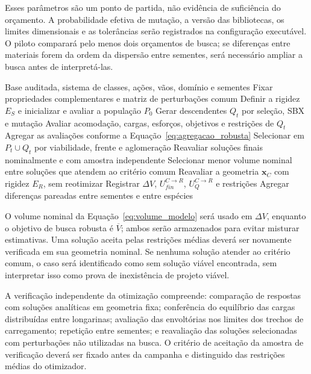 Esses parâmetros são um ponto de partida, não evidência de suficiência do orçamento. A probabilidade efetiva de mutação, a versão das bibliotecas, os limites dimensionais e as tolerâncias serão registrados na configuração executável. O piloto comparará pelo menos dois orçamentos de busca; se diferenças entre materiais forem da ordem da dispersão entre sementes, será necessário ampliar a busca antes de interpretá-las.

\begin{algorithm}[!ht]
\caption{Comparação pareada e reavaliação estrutural}\label{alg:comparacao}
\begin{algorithmic}[1]
\Require Base auditada, sistema de classes, ações, vãos, domínio e sementes
  \State Fixar propriedades complementares e matriz de perturbações comum
    \State Definir a rigidez $E_S$ e inicializar e avaliar a população $P_0$
      \State Gerar descendentes $Q_t$ por seleção, SBX e mutação
      \State Avaliar acomodação, cargas, esforços, objetivos e restrições de $Q_t$
      \State Agregar as avaliações conforme a Equação~\ref{eq:agregacao_robusta}
      \State Selecionar em $P_t\cup Q_t$ por viabilidade, frente e aglomeração
    \EndFor
    \State Reavaliar soluções finais nominalmente e com amostra independente
    \State Selecionar menor volume nominal entre soluções que atendem ao critério comum
  \EndFor
  \State Reavaliar a geometria $\mathbf{x}_C$ com rigidez $E_R$, sem reotimizar
  \State Registrar $\Delta V$, $U_{fin}^{C\rightarrow R}$, $U_Q^{C\rightarrow R}$ e restrições
\EndFor
\State Agregar diferenças pareadas entre sementes e entre espécies
\end{algorithmic}
\end{algorithm}

O volume nominal da Equação~\ref{eq:volume_modelo} será usado em $\Delta V$, enquanto o objetivo de busca robusta é $\overline V$; ambos serão armazenados para evitar misturar estimativas. Uma solução aceita pelas restrições médias deverá ser novamente verificada em sua geometria nominal. Se nenhuma solução atender ao critério comum, o caso será identificado como sem solução viável encontrada, sem interpretar isso como prova de inexistência de projeto viável.

A verificação independente da otimização compreende: comparação de respostas com soluções analíticas em geometria fixa; conferência do equilíbrio das cargas distribuídas entre longarinas; avaliação das envoltórias nos limites dos trechos de carregamento; repetição entre sementes; e reavaliação das soluções selecionadas com perturbações não utilizadas na busca. O critério de aceitação da amostra de verificação deverá ser fixado antes da campanha e distinguido das restrições médias do otimizador.
